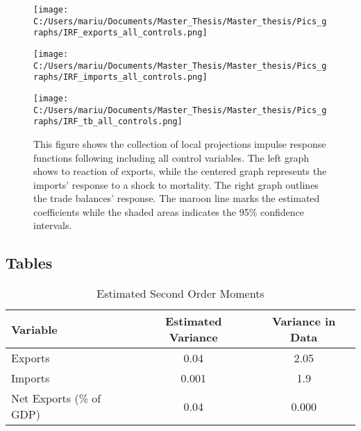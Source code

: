 \documentclass{article}
\begin{document}
\begin{figure}[!ht]{}
\begin{center}
\begin{minipage}[t]{0.9\textwidth}
\begin{minipage}[c]{0.3\linewidth}\vspace{0pt} 
\texttt{[image: C:/Users/mariu/Documents/Master\_Thesis/Master\_thesis/Pics\_graphs/IRF\_exports\_all\_controls.png]}\\
\end{minipage}\hfill%
\begin{minipage}[c]{0.3\linewidth}\vspace{0pt} 
\texttt{[image: C:/Users/mariu/Documents/Master\_Thesis/Master\_thesis/Pics\_graphs/IRF\_imports\_all\_controls.png]}\\
\end{minipage}\hfill%
\begin{minipage}[c]{0.3\linewidth}\vspace{0pt} 
\texttt{[image: C:/Users/mariu/Documents/Master\_Thesis/Master\_thesis/Pics\_graphs/IRF\_tb\_all\_controls.png]}\\
\end{minipage}\hfill%
\caption{This figure shows the collection of local projections impulse response functions following \cite{jorda2005estimation} including all control variables. The left graph shows to reaction of exports, while the centered graph represents the imports' response to a shock to mortality. The right graph outlines the trade balances' response. The maroon line marks the estimated coefficients while the shaded areas indicates the 95\% confidence intervals.}
\label{IRF - All controls}
\end{minipage}
\end{center}
\end{figure}

\pagebreak


\subsection*{Tables}

\begin{table}[htbp]\centering \caption{Estimated Second Order Moments \label{Estimated Second Order Moments}}
\begin{tabular}{l c c}\hline\hline
Variable & Estimated Variance & Variance in Data\\ \hline
Exports & 0.04 & 2.05 \\
Imports & 0.001 & 1.9 \\
Net Exports (\% of GDP) & 0.04 & 0.000 \\ \hline
\end{tabular}
\end{table}
\end{document}
